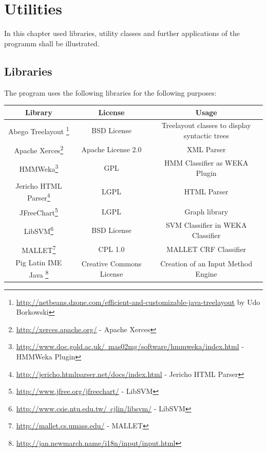 \documentclass[10pt,a4paper,titlepage]{report}
\begin{document}
	\section{Utilities}
	\label{sec:utilities}
	In this chapter used libraries, utility classes and further applications of the programm shall be illustrated.
	\subsection{Libraries}
	\label{sec:libraries}
	The program uses the following libraries for the following purposes:
	\begin{table}[htb]
		\centering
		\begin{tabular}{|c|c|c|}
			\hline
			Library & License & Usage  \\
			\hline
			Abego Treelayout \footnote{\href{http://netbeans.dzone.com/efficient-and-customizable-java-treelayout}{http://netbeans.dzone.com/efficient-and-customizable-java-treelayout}  by Udo Borkowski} & BSD License & Treelayout classes to display syntactic trees\\
			\hline
			Apache Xerces\footnote{\href{http://xerces.apache.org/}{http://xerces.apache.org/} - Apache Xerces} & Apache License 2.0 & XML Parser\\
			\hline
			HMMWeka\footnote{\href{http://www.doc.gold.ac.uk/~mas02mg/software/hmmweka/index.html}{http://www.doc.gold.ac.uk/~mas02mg/software/hmmweka/index.html} - HMMWeka Plugin} & GPL & HMM Classifier as WEKA Plugin\\
			\hline
			Jericho HTML Parser\footnote{\href{http://jericho.htmlparser.net/docs/index.html}{http://jericho.htmlparser.net/docs/index.html} - Jericho HTML Parser} & LGPL & HTML Parser\\
			\hline
			JFreeChart\footnote{\href{http://www.jfree.org/jfreechart/}{http://www.jfree.org/jfreechart/} - LibSVM} & LGPL & Graph library\\
			\hline
			LibSVM\footnote{\href{http://www.csie.ntu.edu.tw/~cjlin/libsvm/}{http://www.csie.ntu.edu.tw/~cjlin/libsvm/} - LibSVM} & BSD License & SVM Classifier in WEKA Classifier\\
			\hline
			MALLET\footnote{\href{		http://mallet.cs.umass.edu/}{		http://mallet.cs.umass.edu/} - MALLET} & CPL 1.0 & MALLET CRF Classifier\\
			\hline
			Pig Latin IME Java \footnote{\href{http://jan.newmarch.name/i18n/input/input.html}{http://jan.newmarch.name/i18n/input/input.html}} & Creative Commons License & Creation of an Input Method Engine\\

\end{tabular}
\end{table}
\end{document}
